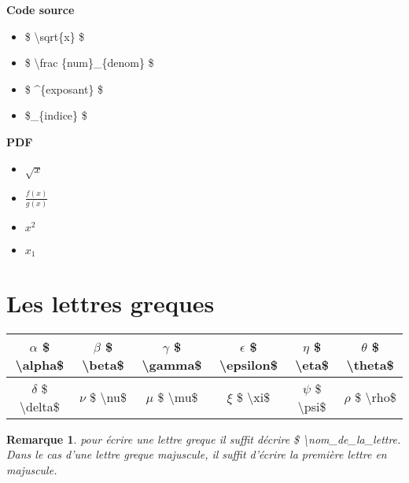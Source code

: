 \documentclass[a4paper,12pt]{article}
\newtheorem{re}{Remarque}
\begin{document}
\begin{minipage}[t]{8cm}	
\textbf{Code source}\\
\begin{itemize}
\item \$ \textbackslash sqrt\{x\} \$
\item \$ \textbackslash frac \{num\}\_\{denom\} \$
\item \$ \textasciicircum\{exposant\} \$	
\item \$\_\{indice\} \$
\end{itemize}
\end{minipage}
\begin{minipage}[t]{8cm}
\textbf{PDF}\\
\begin{itemize}
\item $\sqrt{x}$
\item $\frac{f(x)}{g(x)}$
\item $x^{2}$
\item$ x_1$
\end{itemize}
\end{minipage}
\section{Les lettres greques}
\begin{tabular}{|c|c|c|c|c|c}
\hline $\alpha$ \$ \textbackslash alpha\$ & $\beta$ \$ \textbackslash beta\$ & $\gamma$ \$ \textbackslash gamma\$ & $\epsilon$ \$ \textbackslash epsilon\$ & $\eta$ \$ \textbackslash eta\$ & $\theta$ \$ \textbackslash theta\$ \\
\hline $\delta$ \$ \textbackslash delta\$ & $\nu$ \$ \textbackslash nu\$ & $\mu$ \$ \textbackslash mu\$ & $\xi$ \$ \textbackslash xi\$ & $\psi$ \$ \textbackslash psi\$ & $\rho$ \$ \textbackslash rho\$ \\
\hline
\end{tabular}
\begin{re}
	pour \'ecrire une lettre greque il suffit d\'ecrire \$ \textbackslash nom\_de\_la\_lettre. Dans le cas d'une lettre greque majuscule, il suffit d'\'ecrire la premi\`ere lettre en majuscule.
\end{re}

	
\end{document}
